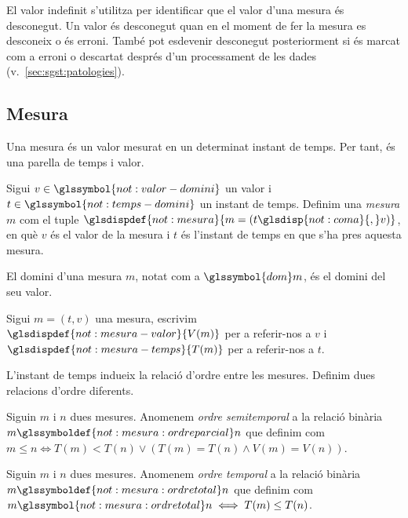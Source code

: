 El valor indefinit s'utilitza per identificar que el valor d'una
mesura és desconegut. Un valor és desconegut quan en el moment de fer
la mesura es desconeix o és erroni. També pot esdevenir desconegut
posteriorment si és marcat com a erroni o descartat després d'un
processament de les dades (v.~\autoref{sec:sgst:patologies}).





\subsection{Mesura}\label{sec:model:mesura} 

Una mesura és un valor mesurat en un determinat instant de temps. Per tant, 
és una parella de temps i valor.

\begin{definition}[Mesura]
  \label{def:model:mesura}
  Sigui $v\in\glssymbol{not:valor-domini}$ un valor i
  $t\in\glssymbol{not:temps-domini}$ un instant de temps. Definim una
  \emph{mesura} $m$ com el tuple
  $\glsdispdef{not:mesura}{m=(t\glsdisp{not:coma}{,}v)}$, en què $v$
  és el valor de la mesura i $t$ és l'instant de temps en que s'ha
  pres aquesta mesura.

  El domini d'una mesura $m$, notat com a
  $\glssymbol{dom}m$, és el domini del seu valor.
\end{definition}


Sigui $m=(t,v)$ una mesura, escrivim
$\glsdispdef{not:mesura-valor}{V(m)}$ per a referir-nos a $v$ i
$\glsdispdef{not:mesura-temps}{T(m)}$ per a referir-nos a $t$.


L'instant de temps indueix la relació d'ordre
entre les mesures. Definim dues relacions d'ordre diferents.

\begin{definition}
  Siguin $m$ i $n$ dues mesures. Anomenem \emph{ordre semitemporal} a
  la relació binària $m\glssymboldef{not:mesura:ordreparcial} n$ que
  definim com $m\leq n \iff T(m) < T(n) \vee ( T(m) = T(n)\wedge V(m)
  = V(n))$.
\end{definition}


\begin{definition}
  \label{def:model:mesura-relacio-ordre}
  Siguin $m$ i $n$ dues mesures. Anomenem \emph{ordre temporal} a la
  relació binària $m\glssymboldef{not:mesura:ordretotal} n$ que
  definim com $m\glssymbol{not:mesura:ordretotal} n \iff T(m) \leq
  T(n) $.
\end{definition}


